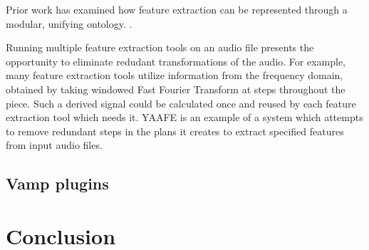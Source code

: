\documentclass[11pt,conference,letterpaper]{IEEEtran}
\begin{document}
Prior work has examined how feature extraction can be represented through a modular, unifying ontology. \cite{raimond2008web}.

Running multiple feature extraction tools on an audio file presents the opportunity to eliminate redudant transformations of the audio. For example, many feature extraction tools utilize information from the frequency domain, obtained by taking windowed Fast Fourier Transform at steps throughout the piece. Such a derived signal could be calculated once and reused by each feature extraction tool which needs it. YAAFE \cite{mathieu2010yaafe} is an example of a system which attempts to remove redundant steps in the plans it creates to extract specified features from input audio files.

\subsection{Vamp plugins}

\section{Conclusion}



\end{document}
